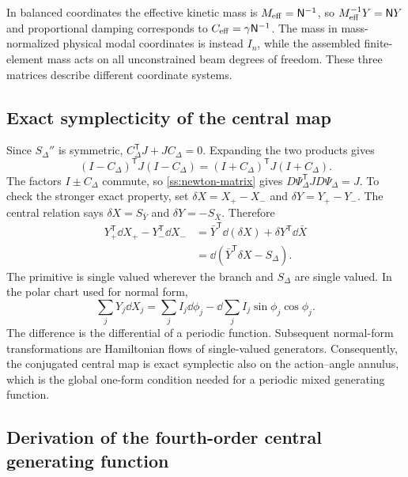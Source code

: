 In balanced coordinates the effective kinetic mass is $M_{\rm eff}=\mathsf N^{-1}$, so $M_{\rm eff}^{-1}Y=\mathsf N Y$ and proportional damping corresponds to $C_{\rm eff}=\gamma\mathsf N^{-1}$. The mass in mass-normalized physical modal coordinates is instead $I_n$, while the assembled finite-element mass acts on all unconstrained beam degrees of freedom. These three matrices describe different coordinate systems.

\subsection{Exact symplecticity of the central map}
\label{ss:exact-symplectic}

Since $S_\Delta''$ is symmetric, $C_\Delta^{\mathsf T}J+JC_\Delta=0$. Expanding the two products gives
\[
 (I-C_\Delta)^{\mathsf T}J(I-C_\Delta)
 =(I+C_\Delta)^{\mathsf T}J(I+C_\Delta).
\]
The factors $I\pm C_\Delta$ commute, so \eqref{ss:newton-matrix} gives $D\Psi_\Delta^{\mathsf T}JD\Psi_\Delta=J$. To check the stronger exact property, set $\delta X=X_+-X_-$ and $\delta Y=Y_+-Y_-$. The central relation says $\delta X=S_{\bar Y}$ and $\delta Y=-S_{\bar X}$. Therefore
\begin{equation}\label{ss:primitive}
\begin{aligned}
 Y_+^{\mathsf T}\dd X_+-Y_-^{\mathsf T}\dd X_-
 &=\bar Y^{\mathsf T}\dd(\delta X)+\delta Y^{\mathsf T}\dd\bar X\\
 &=\dd(\bar Y^{\mathsf T}\delta X-S_\Delta).
\end{aligned}
\end{equation}
The primitive is single valued wherever the branch and $S_\Delta$ are single valued. In the polar chart used for normal form,
\[
 \sum_jY_j\dd X_j
   =\sum_j I_j\dd\phi_j
      -\dd\sum_j I_j\sin\phi_j\cos\phi_j.
\]
The difference is the differential of a periodic function. Subsequent normal-form transformations are Hamiltonian flows of single-valued generators. Consequently, the conjugated central map is exact symplectic also on the action--angle annulus, which is the global one-form condition needed for a periodic mixed generating function.

\subsection{Derivation of the fourth-order central generating function}
\label{ss:central4}

